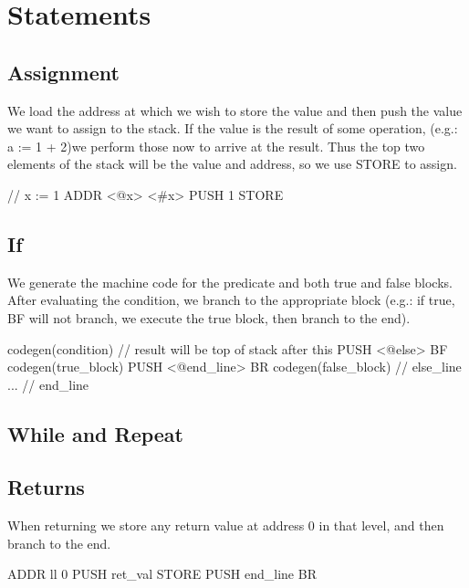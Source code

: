 \section{Statements}
\subsection{Assignment}

We load the address at which we wish to store the value and then push the value
we want to assign to the stack. If the value is the result of some operation, 
(e.g.: a := 1 + 2)we perform those now to arrive at the result. Thus the top two 
elements of the stack will be the value and address, so we use STORE to assign.

\begin{code}[Assignment]
// x := 1
ADDR <@x> <#x>
PUSH 1
STORE
\end{code}

\subsection{If}

We generate the machine code for the predicate and both true and false blocks.
After evaluating the condition, we branch to the appropriate block (e.g.: if true,
BF will not branch, we execute the true block, then branch to the end).

\begin{code}[IfStatement]
codegen(condition)      // result will be top of stack after this
PUSH <@else>
BF   
codegen(true_block)             
PUSH <@end_line> 
BR           
codegen(false_block)    // else_line
...                     // end_line
\end{code}

\subsection{While and Repeat}



\subsection{Returns}

When returning we store any return value at address 0 in that level, and then
branch to the end.

\begin{code}[IfStatement]
ADDR ll 0
PUSH ret_val
STORE
PUSH end_line
BR
\end{code}


